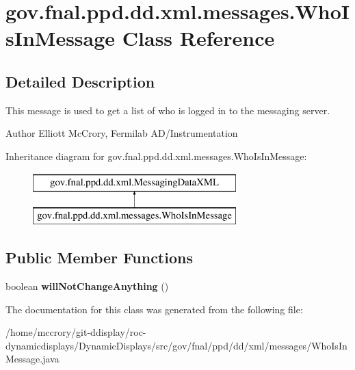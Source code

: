 \hypertarget{classgov_1_1fnal_1_1ppd_1_1dd_1_1xml_1_1messages_1_1WhoIsInMessage}{\section{gov.\-fnal.\-ppd.\-dd.\-xml.\-messages.\-Who\-Is\-In\-Message Class Reference}
\label{classgov_1_1fnal_1_1ppd_1_1dd_1_1xml_1_1messages_1_1WhoIsInMessage}
}


\subsection{Detailed Description}
This message is used to get a list of who is logged in to the messaging server.

\begin{DoxyAuthor}{Author}
Elliott Mc\-Crory, Fermilab A\-D/\-Instrumentation 
\end{DoxyAuthor}
Inheritance diagram for gov.\-fnal.\-ppd.\-dd.\-xml.\-messages.\-Who\-Is\-In\-Message\-:\begin{figure}[H]
\begin{center}
\leavevmode
\includegraphics[height=2.000000cm]{classgov_1_1fnal_1_1ppd_1_1dd_1_1xml_1_1messages_1_1WhoIsInMessage}
\end{center}
\end{figure}
\subsection*{Public Member Functions}
\begin{DoxyCompactItemize}
\item 
\hypertarget{classgov_1_1fnal_1_1ppd_1_1dd_1_1xml_1_1messages_1_1WhoIsInMessage_a94708dd1583a22b4779d3f3f1ecad023}{boolean {\bfseries will\-Not\-Change\-Anything} ()}\label{classgov_1_1fnal_1_1ppd_1_1dd_1_1xml_1_1messages_1_1WhoIsInMessage_a94708dd1583a22b4779d3f3f1ecad023}

\end{DoxyCompactItemize}


The documentation for this class was generated from the following file\-:\begin{DoxyCompactItemize}
\item 
/home/mccrory/git-\/ddisplay/roc-\/dynamicdisplays/\-Dynamic\-Displays/src/gov/fnal/ppd/dd/xml/messages/Who\-Is\-In\-Message.\-java\end{DoxyCompactItemize}
